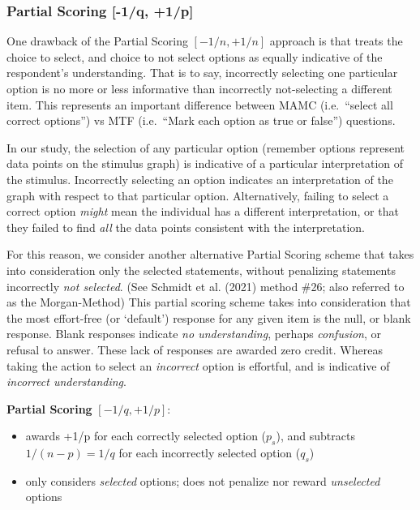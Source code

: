 \documentclass[
  letterpaper,
  DIV=11,
  numbers=noendperiod]{scrreprt}
\providecommand{\tightlist}{%
  \setlength{\itemsep}{0pt}\setlength{\parskip}{0pt}}\usepackage{longtable,booktabs,array}
\begin{document}
\hypertarget{partial-scoring--1q-1p}{%
\subsubsection{Partial Scoring {[}-1/q,
+1/p{]}}\label{partial-scoring--1q-1p}}

One drawback of the Partial Scoring \([-1/n, +1/n]\) approach is that
treats the choice to select, and choice to not select options as equally
indicative of the respondent's understanding. That is to say,
incorrectly selecting one particular option is no more or less
informative than incorrectly not-selecting a different item. This
represents an important difference between MAMC (i.e.~``select all
correct options'') vs MTF (i.e.~``Mark each option as true or false'')
questions.

In our study, the selection of any particular option (remember options
represent data points on the stimulus graph) is indicative of a
particular interpretation of the stimulus. Incorrectly selecting an
option indicates an interpretation of the graph with respect to that
particular option. Alternatively, failing to select a correct option
\emph{might} mean the individual has a different interpretation, or that
they failed to find \emph{all} the data points consistent with the
interpretation.

For this reason, we consider another alternative Partial Scoring scheme
that takes into consideration only the selected statements, without
penalizing statements incorrectly \emph{not selected}. (See Schmidt et
al. (2021) method \#26; also referred to as the Morgan-Method) This
partial scoring scheme takes into consideration that the most
effort-free (or `default') response for any given item is the null, or
blank response. Blank responses indicate \emph{no understanding},
perhaps \emph{confusion}, or refusal to answer. These lack of responses
are awarded zero credit. Whereas taking the action to select an
\emph{incorrect} option is effortful, and is indicative of
\emph{incorrect understanding}.

\textbf{Partial Scoring} \([-1/q, +1/p]\):

\begin{itemize}
\tightlist
\item
  awards +1/p for each correctly selected option (\(p_s\)), and
  subtracts \(1/(n-p) = 1/q\) for each incorrectly selected option
  (\(q_s\))
\item
  only considers \emph{selected} options; does not penalize nor reward
  \emph{unselected} options
\end{itemize}
\end{document}
